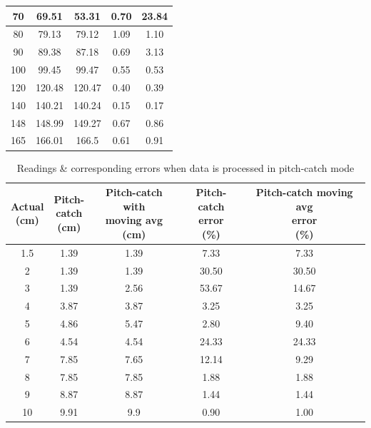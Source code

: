 \begin{table}[!t]
\begin{tabular}{|c|c|c|c|c|}
70 & 69.51 & 53.31 & 0.70 & 23.84 \\ \hline
80 & 79.13 & 79.12 & 1.09 & 1.10 \\ \hline
90 & 89.38 & 87.18 & 0.69 & 3.13 \\ \hline
100 & 99.45 & 99.47 & 0.55 & 0.53 \\ \hline
120 & 120.48 & 120.47 & 0.40 & 0.39 \\ \hline
140 & 140.21 & 140.24 & 0.15 & 0.17 \\ \hline
148 & 148.99 & 149.27 & 0.67 & 0.86 \\ \hline
165 & 166.01 & 166.5 & 0.61 & 0.91 \\ \hline
\end{tabular}
\end{table}

\begin{table}[!t]
\centering
\caption{Readings \& corresponding errors when data is processed in pitch-catch mode}
\scriptsize
\setlength{\tabcolsep}{3pt}
\begin{tabular}{|c|c|c|c|c|}
\hline
\shortstack{\textbf{Actual}\\\textbf{(cm)}} & \shortstack{\textbf{Pitch-}\\\textbf{catch}\\\textbf{(cm)}} & \shortstack{\textbf{Pitch-catch with}\\\textbf{moving avg}\\\textbf{(cm)}} & \shortstack{\textbf{Pitch-catch}\\\textbf{error}\\\textbf{(\%)}} & \shortstack{\textbf{Pitch-catch moving avg}\\\textbf{error}\\\textbf{(\%)}} \\ \hline
1.5 & 1.39 & 1.39 & 7.33 & 7.33 \\ \hline
2 & 1.39 & 1.39 & 30.50 & 30.50 \\ \hline
3 & 1.39 & 2.56 & 53.67 & 14.67 \\ \hline
4 & 3.87 & 3.87 & 3.25 & 3.25 \\ \hline
5 & 4.86 & 5.47 & 2.80 & 9.40 \\ \hline
6 & 4.54 & 4.54 & 24.33 & 24.33 \\ \hline
7 & 7.85 & 7.65 & 12.14 & 9.29 \\ \hline
8 & 7.85 & 7.85 & 1.88 & 1.88 \\ \hline
9 & 8.87 & 8.87 & 1.44 & 1.44 \\ \hline
10 & 9.91 & 9.9 & 0.90 & 1.00 \\ \hline

\end{tabular}
\end{table}
